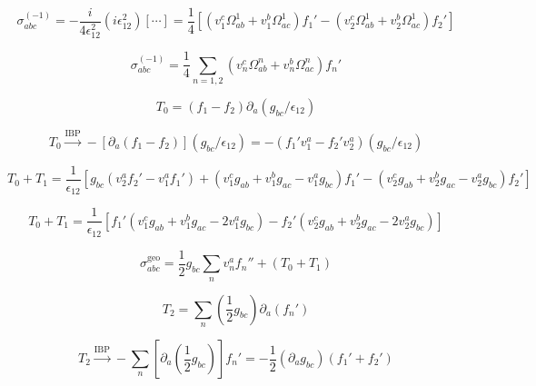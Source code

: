 \documentclass{article}
\begin{document}
\begin{equation}
\label{eq:D-77}
\sigma_{abc}^{(-1)}=-\frac{i}{4\epsilon_{12}^{2}}(i\epsilon_{12}^{2})[\cdots]=\frac{1}{4}[(v_{1}^{c}\Omega_{ab}^{1}+v_{1}^{b}\Omega_{ac}^{1})f_{1}'-(v_{2}^{c}\Omega_{ab}^{1}+v_{2}^{b}\Omega_{ac}^{1})f_{2}']
\end{equation}

\begin{equation}
\label{eq:D-78}
\sigma_{abc}^{(-1)}=\frac{1}{4}\sum_{n=1,2}(v_{n}^{c}\Omega_{ab}^{n}+v_{n}^{b}\Omega_{ac}^{n})f_{n}'
\end{equation}

\begin{equation}
\label{eq:D-114}
T_{0}=(f_{1}-f_{2})\partial_{a}(g_{bc}/\epsilon_{12})
\end{equation}

\begin{equation}
\label{eq:D-119}
T_{0}\xrightarrow{\mathrm{IBP}}-[\partial_{a}(f_{1}-f_{2})](g_{bc}/\epsilon_{12})=-(f_{1}'v_{1}^{a}-f_{2}'v_{2}^{a})(g_{bc}/\epsilon_{12})
\end{equation}

\begin{equation}
\label{eq:D-120}
T_{0}+T_{1}=\frac{1}{\epsilon_{12}}[g_{bc}(v_{2}^{a}f_{2}'-v_{1}^{a}f_{1}')+(v_{1}^{c}g_{ab}+v_{1}^{b}g_{ac}-v_{1}^{a}g_{bc})f_{1}'-(v_{2}^{c}g_{ab}+v_{2}^{b}g_{ac}-v_{2}^{a}g_{bc})f_{2}']
\end{equation}

\begin{equation}
\label{eq:D-121}
T_{0}+T_{1}=\frac{1}{\epsilon_{12}}[f_{1}'(v_{1}^{c}g_{ab}+v_{1}^{b}g_{ac}-2v_{1}^{a}g_{bc})-f_{2}'(v_{2}^{c}g_{ab}+v_{2}^{b}g_{ac}-2v_{2}^{a}g_{bc})]
\end{equation}

\begin{equation}
\label{eq:D-122}
\sigma_{abc}^{\mathrm{geo}}=\frac{1}{2}g_{bc}\sum_{n}v_{n}^{a}f_{n}''+(T_{0}+T_{1})
\end{equation}

\begin{equation}
\label{eq:D-123}
T_{2}=\sum_{n}(\frac{1}{2}g_{bc})\partial_{a}(f_{n}')
\end{equation}

\begin{equation}
\label{eq:D-124}
T_{2}\xrightarrow{\mathrm{IBP}}-\sum_{n}[\partial_{a}(\frac{1}{2}g_{bc})]f_{n}'=-\frac{1}{2}(\partial_{a}g_{bc})(f_{1}'+f_{2}')
\end{equation}
\end{document}
